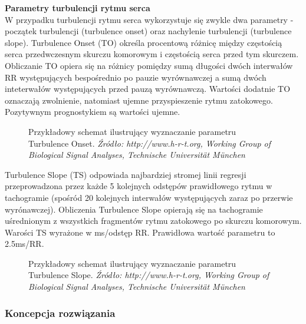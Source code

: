 \documentclass[a4paper, 11pt]{article}
\begin{document}
\textbf{Parametry turbulencji rytmu serca}\\
W przypadku turbulencji rytmu serca wykorzystuje się zwykle dwa parametry
- początek turbulencji (turbulence onset) oraz nachylenie turbulencji (turbulence slope). Turbulence Onset (TO) określa procentową różnicę między częstością serca przedwczesnym skurczu komorowym i częstością serca przed tym skurczem. Obliczanie TO opiera się na różnicy pomiędzy sumą długości dwóch interwałów RR występujących bespośrednio po pauzie wyrównawczej a sumą dwóch inteterwałów występujących przed pauzą wyrównawczą.
Wartości dodatnie TO oznaczają zwolnienie, natomiast ujemne przyspieszenie rytmu zatokowego. Pozytywnym prognostykiem są wartości ujemne.

\begin{figure}[h!]
\centering
\caption{Przykładowy schemat ilustrujący wyznaczanie parametru Turbulence Onset.
\textit{ Źródło: http://www.h-r-t.org, Working Group of Biological Signal Analyses, Technische Universität München} }
\end{figure}
\par Turbulence Slope (TS) odpowiada najbardziej stromej linii regresji przeprowadzona przez każde 5 kolejnych odstępów prawidłowego rytmu w tachogramie (spośród 20 kolejnych interwałów występujących zaraz po przerwie wyrónawczej). Obliczenia Turbulence Slope opierają się na tachogramie uśrednionym z wszystkich fragmentów rytmu zatokowego po skurczu komorowym. Warości TS wyrażone w ms/odstęp RR. Prawidłowa wartość parametru to 2.5ms/RR.
\begin{figure}[h!]
\centering
\caption{Przykładowy schemat ilustrujący wyznaczanie parametru Turbulence Slope.
\textit{ Źródło: http://www.h-r-t.org, Working Group of Biological Signal Analyses, Technische Universität München} }
\end{figure}
\newpage

\subsubsection{Koncepcja rozwiązania}
\label{sec:hrt:procs}
\end{document}
